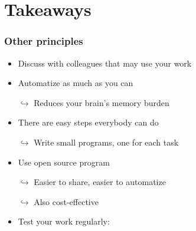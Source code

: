 \documentclass[xcolor=x11names,compress]{beamer}
\renewcommand{\(}{\begin{columns}}
\renewcommand{\)}{\end{columns}}
\newcommand{\<}[1]{\begin{column}{#1}}
\renewcommand{\>}{\end{column}}
\begin{document}
\section{Takeaways}

\begin{frame}
\frametitle{Other principles}
    \begin{itemize}[<+->]
        \item Discuss with colleagues that may use your work
        \item Automatize as much as you can
        \item[$\hookrightarrow$] Reduces your brain's memory burden
        \item There are easy steps everybody can do
        \item[$\hookrightarrow$] Write small programs, one for each task
        \item Use open source program
        \item[$\hookrightarrow$] Easier to share, easier to automatize
        \item[$\hookrightarrow$] Also cost-effective
        \item Test your work regularly:
    \end{itemize}
\end{frame}
\end{document}
